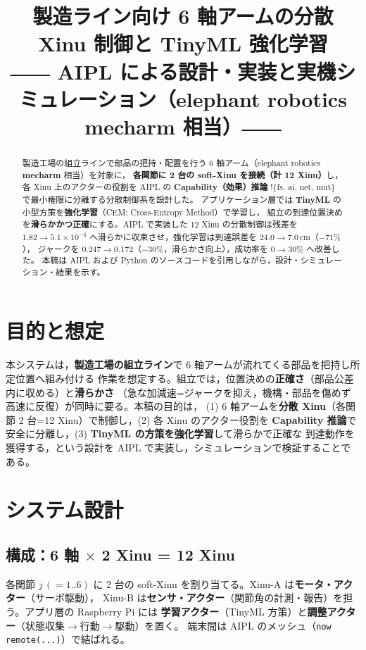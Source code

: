 \documentclass[11pt,a4paper]{ltjsarticle}
\title{\textbf{製造ライン向け 6 軸アームの分散 Xinu 制御と TinyML 強化学習}\\[3pt]
\large ―― AIPL による設計・実装と実機シミュレーション（elephant robotics mecharm 相当）――}
\author{}\date{}
\begin{document}
\maketitle\thispagestyle{empty}

\begin{abstract}\small\noindent
製造工場の組立ラインで部品の把持・配置を行う 6 軸アーム（elephant robotics \textbf{mecharm} 相当）を対象に，
\textbf{各関節に 2 台の soft-Xinu を接続（計 12 Xinu）}し，各 Xinu 上のアクターの役割を AIPL の
\textbf{Capability（効果）推論} $!\{$fs, ai, net, mut$\}$ で最小権限に分離する分散制御系を設計した。
アプリケーション層では \textbf{TinyML} の小型方策を\textbf{強化学習}（CEM: Cross-Entropy Method）で学習し，
組立の到達位置決めを\textbf{滑らかかつ正確}にする。AIPL で実装した 12 Xinu の分散制御は残差を
$1.82 \to 5.1\times10^{-4}$ へ滑らかに収束させ，強化学習は到達誤差を $24.0 \to 7.0$\,cm（$-71\%$），
ジャークを $0.247 \to 0.172$（$-30\%$，滑らかさ向上），成功率を $0 \to 30\%$ へ改善した。
本稿は AIPL および Python のソースコードを引用しながら，設計・シミュレーション・結果を示す。
\end{abstract}

\section{目的と想定}
本システムは，\textbf{製造工場の組立ライン}で 6 軸アームが流れてくる部品を把持し所定位置へ組み付ける
作業を想定する。組立では，位置決めの\textbf{正確さ}（部品公差内に収める）と\textbf{滑らかさ}
（急な加減速=ジャークを抑え，機構・部品を傷めず高速に反復）が同時に要る。本稿の目的は，
(1) 6 軸アームを\textbf{分散 Xinu}（各関節 2 台=12 Xinu）で制御し，(2) 各 Xinu のアクター役割を
\textbf{Capability 推論}で安全に分離し，(3) \textbf{TinyML の方策を強化学習}して滑らかで正確な
到達動作を獲得する，という設計を AIPL で実装し，シミュレーションで検証することである。

\section{システム設計}
\subsection{構成：6 軸 $\times$ 2 Xinu = 12 Xinu}
各関節 $j\,(=1..6)$ に 2 台の soft-Xinu を割り当てる。Xinu-A は\textbf{モータ・アクター}（サーボ駆動），
Xinu-B は\textbf{センサ・アクター}（関節角の計測・報告）を担う。アプリ層の Raspberry Pi には
\textbf{学習アクター}（TinyML 方策）と\textbf{調整アクター}（状態収集$\to$行動$\to$駆動）を置く。
端末間は AIPL のメッシュ（\texttt{now remote(...)}）で結ばれる。
\end{document}
